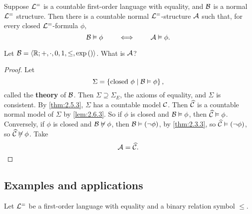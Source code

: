 
\begin{theorem}
\label{thm:2.6.6}
Suppose $ \LL^= $ is a countable first-order language with equality, and $ \BB $ is a normal $ \LL^= $ structure. Then there is a countable normal $ \LL^= $-structure $ \AA $ such that, for every closed $ \LL^= $-formula $ \phi $,
$$ \BB \vDash \phi \qquad \iff \qquad \AA \vDash \phi. $$
\end{theorem}

\begin{example*}
Let $ \BB = \ab{\R; +, \cdot, 0, 1, \le, \exp\rb{}} $. What is $ \AA $?
\end{example*}

\begin{proof}
Let
$$ \Sigma = \cb{\text{closed} \ \phi \mid \BB \vDash \phi}, $$
called the \textbf{theory} of $ \BB $. Then $ \Sigma \supseteq \Sigma_E $, the axioms of equality, and $ \Sigma $ is consistent. By \ref{thm:2.5.3}, $ \Sigma $ has a countable model $ \CC $. Then $ \widehat{\CC} $ is a countable normal model of $ \Sigma $ by \ref{lem:2.6.3}. So if $ \phi $ is closed and $ \BB \vDash \phi $, then $ \widehat{\CC} \vDash \phi $. Conversely, if $ \phi $ is closed and $ \BB \not\vDash \phi $, then $ \BB \vDash \notb{\phi} $, by \ref{thm:2.3.3}, so $ \widehat{\CC} \vDash \notb{\phi} $, so $ \widehat{\CC} \not\vDash \phi $. Take
$$ \AA = \widehat{\CC}. $$
\end{proof}

\subsection{Examples and applications}

Let $ \LL^= $ be a first-order language with equality and a binary relation symbol $ \le $.


